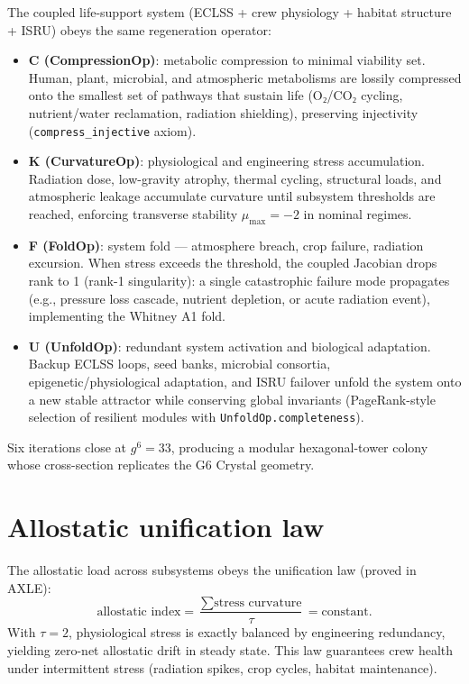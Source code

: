 \documentclass[19pt]{book}
\theoremstyle{plain}
\theoremstyle{definition}
\theoremstyle{remark}
\begin{document}
The coupled life-support system (ECLSS + crew physiology + habitat structure + ISRU) obeys the same regeneration operator:

\begin{itemize}
\item \textbf{C (CompressionOp)}: metabolic compression to minimal viability set. Human, plant, microbial, and atmospheric metabolisms are lossily compressed onto the smallest set of pathways that sustain life (O₂/CO₂ cycling, nutrient/water reclamation, radiation shielding), preserving injectivity (\texttt{compress\_injective} axiom).
\item \textbf{K (CurvatureOp)}: physiological and engineering stress accumulation. Radiation dose, low-gravity atrophy, thermal cycling, structural loads, and atmospheric leakage accumulate curvature until subsystem thresholds are reached, enforcing transverse stability \(\mu_{\max} = -2\) in nominal regimes.
\item \textbf{F (FoldOp)}: system fold — atmosphere breach, crop failure, radiation excursion. When stress exceeds the threshold, the coupled Jacobian drops rank to 1 (rank-1 singularity): a single catastrophic failure mode propagates (e.g., pressure loss cascade, nutrient depletion, or acute radiation event), implementing the Whitney A1 fold.
\item \textbf{U (UnfoldOp)}: redundant system activation and biological adaptation. Backup ECLSS loops, seed banks, microbial consortia, epigenetic/physiological adaptation, and ISRU failover unfold the system onto a new stable attractor while conserving global invariants (PageRank-style selection of resilient modules with \texttt{UnfoldOp.completeness}).
\end{itemize}

Six iterations close at \(g^6 = 33\), producing a modular hexagonal-tower colony whose cross-section replicates the G6 Crystal geometry.

\section{Allostatic unification law}

The allostatic load across subsystems obeys the unification law (proved in AXLE):
\[
\text{allostatic index} = \frac{\sum \text{stress curvature}}{\tau} = \text{constant}.
\]
With \(\tau = 2\), physiological stress is exactly balanced by engineering redundancy, yielding zero-net allostatic drift in steady state. This law guarantees crew health under intermittent stress (radiation spikes, crop cycles, habitat maintenance).
\end{document}
